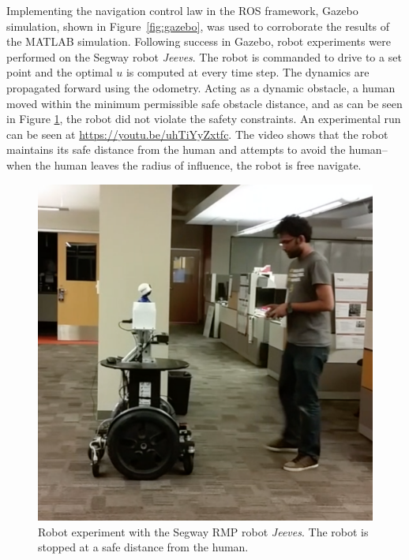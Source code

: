 \documentclass[conference]{IEEEtran}
\begin{document}
Implementing the navigation control law in the ROS framework, Gazebo simulation, shown in Figure~\ref{fig:gazebo}, was used to corroborate the results of the MATLAB simulation. Following success in Gazebo, robot experiments were performed on the Segway robot \textit{Jeeves}. The robot is commanded to drive to a set point and the optimal $u$ is computed at every time step. The dynamics are propagated forward using the odometry. Acting as a dynamic obstacle, a human moved within the minimum permissible safe obstacle distance, and as can be seen in Figure \ref{fig:jeeves_exp}, the robot did not violate the safety constraints. An experimental run can be seen at \url {https://youtu.be/uhTiYyZxtfc}. The video shows that the robot maintains its safe distance from the human and attempts to avoid the human--when the human leaves the radius of influence, the robot is free navigate.

\begin{figure}[t]
\centering
\includegraphics[scale=0.13]{jeeves_exp.png} 
\caption{Robot experiment with the Segway RMP robot \textit{Jeeves}. The robot is stopped at a safe distance from the human. \label{fig:jeeves_exp}}
\end{figure}
\end{document}
